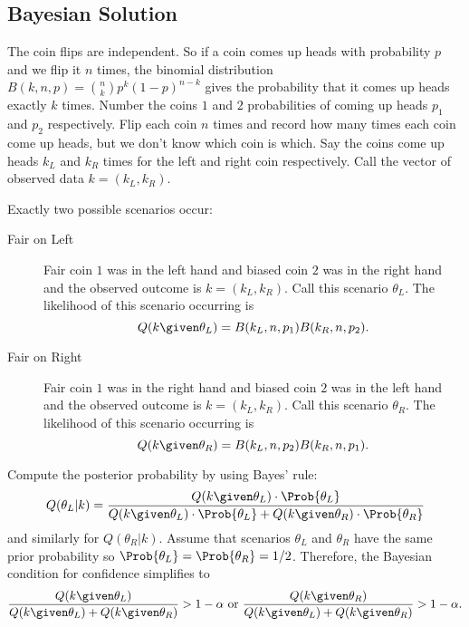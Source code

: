 \documentclass[12pt]{article}
\begin{document}
\subsection*{Bayesian Solution}

The coin flips are independent.  So if a coin comes up heads with
probability \( p \) and we flip it \( n \) times, the binomial
distribution \( B(k, n, p) = \binom{n}{k} p^k(1-p)^{n-k} \) gives the
probability that it comes up heads exactly \( k \) times. Number the
coins \( 1 \) and \( 2 \) probabilities of coming up heads \( p_{1} \)
and \( p_{2} \) respectively.  Flip each coin \( n \) times and record
how many times each coin come up heads, but we don't know which coin is
which.  Say the coins come up heads \( k_{L} \) and \( k_{R} \) times
for the left and right coin respectively.  Call the vector of observed
data \( k = (k_L, k_R) \).

Exactly two possible scenarios occur:
\begin{description}
    \item[Fair on Left]
        Fair coin \( 1 \) was in the left hand and biased coin \( 2 \)
        was in the right hand and the observed outcome is \( k = (k_L, k_R)
        \).  Call this scenario \( \theta_L \).  The likelihood of this
        scenario occurring is
        \[
            Q(k \given \theta_L) = B(k_L, n, p_1)B(k_R, n, p_2).
        \]
    \item[Fair on Right]
        Fair coin \( 1 \) was in the right hand and biased coin \( 2 \)
        was in the left hand and the observed outcome is \( k = (k_L, k_R)
        \).  Call this scenario \( \theta_R \).  The likelihood of this
        scenario occurring is
        \[
            Q(k \given \theta_R) = B(k_L, n, p_2)B(k_R, n, p_1).
        \]
\end{description}

Compute the posterior probability by using Bayes’ rule:
\[
    Q( \theta_L | k ) = \frac{Q(k \given \theta_L) \cdot \Prob{\theta_L}}
    {Q(k \given \theta_L ) \cdot \Prob{\theta_L} + Q(k \given \theta_R )
    \cdot \Prob{\theta_R}}
\] and similarly for \( Q( \theta_R | k ) \).%
Assume that scenarios \( \theta_L \) and \( \theta_R \) have the same
prior probability so \( \Prob{\theta_L} = \Prob{\theta_R} = 1/2 \).
Therefore, the Bayesian condition for confidence simplifies to
\[
    \frac{Q(k \given \theta_L)}{Q(k \given \theta_L) + Q(k \given \theta_R)
    } > 1- \alpha \text{ or } \frac{Q(k \given \theta_R)}{Q(k \given
    \theta_L ) + Q(k \given \theta_R) } > 1- \alpha.
\]
\end{document}
